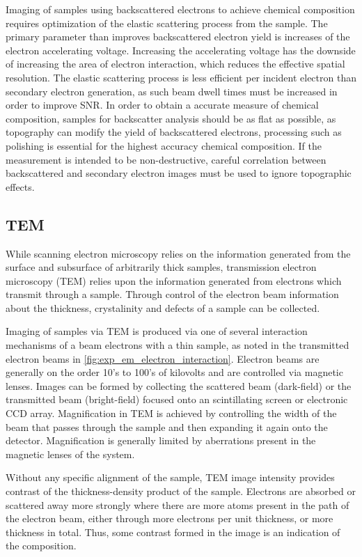 Imaging of samples using backscattered electrons to achieve chemical composition requires optimization of the elastic scattering process from the sample.
The primary parameter than improves backscattered electron yield is increases of the electron accelerating voltage.
Increasing the accelerating voltage has the downside of increasing the area of electron interaction, which reduces the effective spatial resolution\cite{goldstein2003scanning}.
The elastic scattering process is less efficient per incident electron than secondary electron generation, as such beam dwell times must be increased in order to improve SNR\@.
In order to obtain a accurate measure of chemical composition, samples for backscatter analysis should be as flat as possible, as topography can modify the yield of backscattered electrons, processing such as polishing is essential for the highest accuracy chemical composition.
If the measurement is intended to be non-destructive, careful correlation between backscattered and secondary electron images must be used to ignore topographic effects.
\subsection{TEM} While scanning electron microscopy relies on the information generated from the surface and subsurface of arbitrarily thick samples, transmission electron microscopy (TEM) relies upon the information generated from electrons which transmit through a sample.
Through control of the electron beam information about the thickness, crystalinity and defects of a sample can be collected.

Imaging of samples via TEM is produced via one of several interaction mechanisms of a beam electrons with a thin sample, as noted in the transmitted electron beams in \cref{fig:exp_em_electron_interaction}.
Electron beams are generally on the order 10's to 100's of kilovolts and are controlled via magnetic lenses\cite{Egerton2005}.
Images can be formed by collecting the scattered beam (dark-field) or the transmitted beam (bright-field) focused onto an scintillating screen or electronic CCD array.
Magnification in TEM is achieved by controlling the width of the beam that passes through the sample and then expanding it again onto the detector.
Magnification is generally limited by aberrations present in the magnetic lenses of the system.

Without any specific alignment of the sample, TEM image intensity provides contrast of the thickness-density product of the sample\cite{Egerton2005}.
Electrons are absorbed or scattered away more strongly where there are more atoms present in the path of the electron beam, either through more electrons per unit thickness, or more thickness in total.
Thus, some contrast formed in the image is an indication of the composition.

